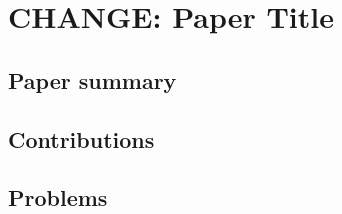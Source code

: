 \documentclass[a4paper, 12pt]{article}
\begin{document}
\section*{CHANGE: Paper Title}
\subsection{Paper summary}

\lipsum[1]

\subsection{Contributions}

\lipsum[1]

\subsection{Problems}

\lipsum[1]
\end{document}
